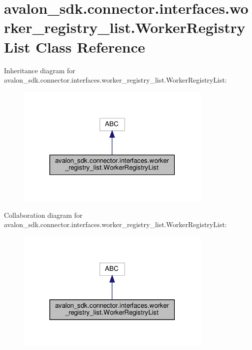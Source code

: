 \hypertarget{classavalon__sdk_1_1connector_1_1interfaces_1_1worker__registry__list_1_1WorkerRegistryList}{}\section{avalon\+\_\+sdk.\+connector.\+interfaces.\+worker\+\_\+registry\+\_\+list.\+Worker\+Registry\+List Class Reference}
\label{classavalon__sdk_1_1connector_1_1interfaces_1_1worker__registry__list_1_1WorkerRegistryList}


Inheritance diagram for avalon\+\_\+sdk.\+connector.\+interfaces.\+worker\+\_\+registry\+\_\+list.\+Worker\+Registry\+List\+:
\nopagebreak
\begin{figure}[H]
\begin{center}
\leavevmode
\includegraphics[width=270pt]{classavalon__sdk_1_1connector_1_1interfaces_1_1worker__registry__list_1_1WorkerRegistryList__inherit__graph}
\end{center}
\end{figure}


Collaboration diagram for avalon\+\_\+sdk.\+connector.\+interfaces.\+worker\+\_\+registry\+\_\+list.\+Worker\+Registry\+List\+:
\nopagebreak
\begin{figure}[H]
\begin{center}
\leavevmode
\includegraphics[width=270pt]{classavalon__sdk_1_1connector_1_1interfaces_1_1worker__registry__list_1_1WorkerRegistryList__coll__graph}
\end{center}
\end{figure}
